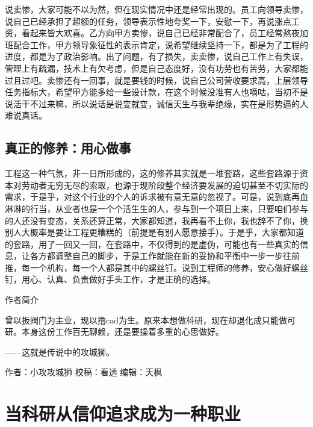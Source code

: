 \documentclass[
]{book}
\begin{document}
说卖惨，大家可能不以为然，但在现实情况中还是经常出现的。员工向领导卖惨，说自己已经承担了超额的任务，领导表示性地夸奖一下，安慰一下，再说涨点工资，看起来皆大欢喜。乙方向甲方卖惨，说自己已经非常配合了，员工经常熬夜加班配合工作，甲方领导象征性的表示肯定，说希望继续坚持一下，都是为了工程的进度，都是为了政治影响。出了问题，有了损失，卖卖惨，说自己工作上有失误，管理上有疏漏，技术上有欠考虑，但是自己态度好，没有功劳也有苦劳，大家都能过且过吧。卖惨还有一回事，就是要钱的时候，说自己公司营收要求高，上层领导任务指标大，希望甲方能多给一些设计款，在这个时候没准有人也嘀咕，当初不是说活干不过来嘛，所以说话是说变就变，诚信天生与我辈绝缘，实在是形势逼的人难说真话。

\hypertarget{ux771fux6b63ux7684ux4feeux517bux7528ux5fc3ux505aux4e8b}{%
\subsection{真正的修养：用心做事}\label{ux771fux6b63ux7684ux4feeux517bux7528ux5fc3ux505aux4e8b}}

工程这一种气氛，非一日所形成的，这的修养其实就是一堆套路，这些套路源于资本对劳动者无穷无尽的索取，也源于现阶段整个经济要发展的迫切甚至不切实际的需求，于是乎，对这个行业的个人的诉求被有意无意的忽视了。可是，说到底再血淋淋的行当，从业者也是一个个活生生的人，参与到一个项目上来，只要咱们参与的人还没有变态，关系还算正常，大家都知道，我再看不上你，我也辞不了你，换别人大概率是要让工程更糟糕的（前提是有别人愿意接手）。于是乎，大家都知道的套路，用了一回又一回，在套路中，不仅得到的是虚伪，可能也有一些真实的信息，让各方都调整自己的脚步，于是工作就能在新的妥协和平衡中一步一步往前推，每一个机构，每一个人都是其中的螺丝钉。说到工程师的修养，安心做好螺丝钉，用心、认真、负责做好手头工作，才是正确的选择。

作者简介

曾以扳阀门为主业，现以撸cad为生。原来本想做科研，现在却退化成只能做可研。本身这份工作百无聊赖，还是要操着多重的心思做好。

------这就是传说中的攻城狮。

作者：小攻攻城狮
校稿：看透
编辑：天枫

\hypertarget{ux5f53ux79d1ux7814ux4eceux4fe1ux4ef0ux8ffdux6c42ux6210ux4e3aux4e00ux79cdux804cux4e1a}{%
\section{当科研从信仰追求成为一种职业}\label{ux5f53ux79d1ux7814ux4eceux4fe1ux4ef0ux8ffdux6c42ux6210ux4e3aux4e00ux79cdux804cux4e1a}}
\end{document}
